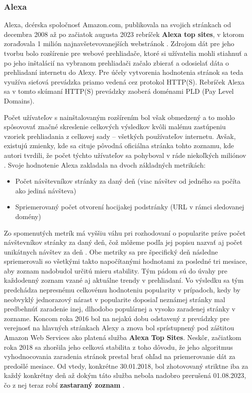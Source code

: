 \subsubsection{Alexa}

Alexa, dcérska spoločnosť Amazon.com, publikovala na svojich stránkach od decembra 2008 až po začiatok augusta 2023 rebríček \textbf{Alexa top sites}, v ktorom zoraďovala 1 milión 
najnavšetevovanejších webstránok \cite{tranco-methodology}.
Zdrojom dát pre jeho tvorbu bolo rozšírenie pre webové prehliadače, ktoré si užívatelia mohli stiahnuť a po jeho inštalácií na vybranom prehliadači začalo zbierať a odosielať
dáta o prehliadaní internetu do Alexy. 
Pre účely vytvorenia hodnotenia stránok sa teda využíva sieťová prevádzka priamo vedená cez protokol HTTP(S). 
Rebríček Alexa sa v tomto skúmaní HTTP(S) prevádzky zaoberá doménami PLD (Pay Level Domains). 

Počet užívateľov s nainštalovaným rozšírením bol však obmedzený 
a to mohlo spôsovovať značné skreslenie celkových výsledkov kvôli malému zastúpeniu vzoriek prehliadania z celkovej sady -- všetkých používateľov internetu. 
Avšak, existujú zmienky, kde sa cituje pôvodná oficiálna stránka tohto zoznamu, kde autori tvrdili, že počet týchto užívateľov sa pohyboval v ráde niekoľkých miliónov \cite{tranco}.
Svoje hodnotenie Alexa zakladala na dvoch základných metrikách: \cite{kinsta-alexa-rank-article}\cite{tranco}
\begin{itemize}
    \item Počet návštevníkov stránky za daný deň (viac návštev od jedného sa počíta ako jediná návšteva)
    \item Spriemerovaný počet otvorení hocijakej podstránky (URL v rámci sledovanej domény)
\end{itemize}

Zo spomenutých metrík má vyššiu váhu pri rozhodovaní o popularite práve počet návštevníkov stránky za daný deň, čož môžeme podľa jej popisu nazvať aj počet unikátnych návštev za deň \cite{tranco}.
Obe metriky sa pre špecifický deň následne spriemerovali so všetkými takto napočítanými hodnotami za posledné tri mesiace, aby zoznam nadobudol určitú mieru stability. 
Tým pádom sú do úvahy pre každodenný zoznam vzané aj aktuálne trendy v prehliadaní. Vo výsledku sa tým predchádza nepresnému celkovému hodnoteniu popularity v prípadoch, 
kedy by neobvyklý jednorazový nárast v popularite doposiaľ neznámej stránky mal predbehnúť zaradenie inej, dlhodobo populárnej a vysoko zaradenej stránky v zozname. 
Koncom roka 2016 bol na nejakú dobu odstavený z prevádzky pre verejnosť na hlavných stránkach Alexy a znova bol sprístupnený pod záštitou Amazon Web Services ako platená služba \textbf{Alexa Top Sites}. 
Neskôr, začiatkom roka 2018 sa zhoršila jeho celková stabilita z toho dôvodu, že jeho algoritmus vyhodnocovania zaradenia stránok prestal brať ohľad na priemerovanie dát za predošlé mesiace.
Od vtedy, konkrétne 30.01.2018, bol zhotovovaný striktne iba za každý konkrétny deň \cite{tranco} až dokým táto služba nebola nadobro prerušená 01.08.2023, čo z nej teraz robí \textbf{zastaraný zoznam} \cite{tranco-methodology}.


